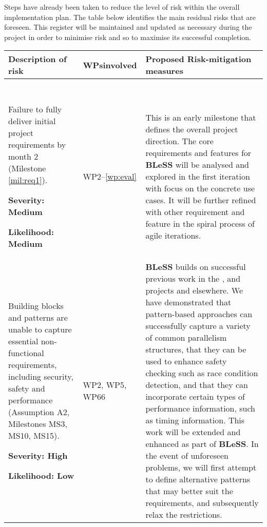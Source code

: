 \documentclass[a4paper,11pt]{article}
\newcommand{\project}[1]{\textbf{#1}\xspace}
\newcommand{\BLESS}{\project{BLeSS}}
\newcommand{\TheProject}{\BLESS}
\begin{document}
\bigskip
Steps have already been taken to reduce the level of risk within the overall implementation plan.  The table below
identifies the main residual risks that are foreseen.  This register will be maintained
and updated as necessary during the project in order to minimise risk and so to maximise its successful completion.

\bigskip

\begin{longtable}{| p{3.5cm} | p{1.5cm} | p{11.8cm}  |}  \hline
\textbf{Description of risk} & \textbf{WPs\newline involved} & \textbf{Proposed Risk-mitigation measures} \\ \hline
\multicolumn{3}{l}{\ }
\\\hline
Failure to fully deliver initial project requirements 
by month 2 (Milestone \ref{mil:req1}). 
\par\vspace{1ex}
\textbf{Severity: Medium}
\par
\textbf{Likelihood: Medium}&
WP2--\ref{wp:eval}  &  
This is an early milestone that defines the overall project direction.  
The core requirements and features for \TheProject{} will be analysed and explored in the first iteration with focus on the concrete use cases. It will be further refined with other requirement and feature in the spiral process of agile iterations. 

\\ \hline
Building blocks and patterns are unable to capture essential non-functional
requirements, including security, safety and performance (Assumption A2, Milestones MS3, MS10, MS15).
\par\vspace{1ex}
\textbf{Severity: High}
\par
\textbf{Likelihood: Low} &
WP2, WP5, WP66  &  
\TheProject{} builds on successful previous work in
the \paraphrase{}, \rephrase{} and \paraformance{}
projects and elsewhere. We have demonstrated that pattern-based approaches can successfully capture
a variety of common parallelism structures, that they can be used to enhance safety
checking such as race condition detection, and  that they can incorporate certain types
of performance information, such as timing information. This work will be extended and
enhanced as part of \TheProject{}. In the event of unforeseen problems, we will first
attempt to define alternative patterns that may better suit the requirements,
and subsequently relax the restrictions.


\end{longtable}
\end{document}
